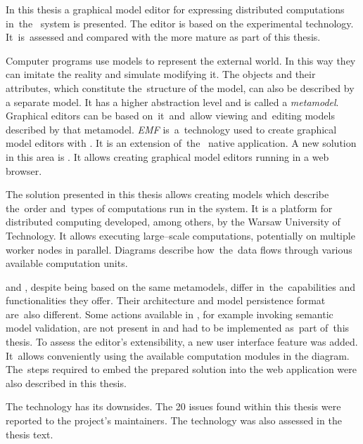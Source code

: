 {
In this thesis a graphical model editor for expressing distributed
computations in~the~\BalticLSC{} system is presented. The editor is based on
the experimental \SiriusWeb{} technology. It~is~assessed and
compared with the more mature \SiriusDesktop{} as part of this thesis.

Computer programs use models to represent the external world. In this way they
can imitate the reality and simulate modifying it. The objects and their
attributes, which constitute the~structure of the model, can also be described
by a separate model. It has a higher abstraction level and is called a
\emph{metamodel}.
Graphical editors can be based on~it~and~allow viewing and~editing models
described by that metamodel. \emph{\acrlong{EMF}} is~a~technology used to
create graphical model editors with \SiriusDesktop{}. It is an extension
of~the~\Eclipse{} native application. A new solution in this area is
\SiriusWeb{}. It
allows creating graphical model editors running in a web browser.

The solution presented in this thesis allows creating models which describe
the~order and~types of computations run in the \BalticLSC{} system. It is a
platform for distributed computing developed, among others, by the Warsaw
University of
Technology. It allows executing large--scale %
computations, potentially on multiple worker nodes in parallel.
Diagrams describe how~the~data flows through various available computation
units.

\SiriusDesktop{} and \SiriusWeb{}, despite being based on the same metamodels,
differ in~the~capabilities and functionalities they offer. Their architecture
and model persistence format are~also different. Some actions available in
\SiriusDesktop{}, for example invoking semantic model validation, are not
present in \SiriusWeb{} and had to be implemented as~part of~this thesis.
To assess the editor's extensibility, a new user interface feature was added.
It~allows conveniently using the available computation modules in the
diagram. The~steps required to embed the prepared solution into the
\BalticLSC{} web application were also described in this thesis.

The \SiriusWeb{} technology has its downsides. The 20 issues found within this
thesis were reported to the project's maintainers. The technology was also
assessed in the thesis text.
}
